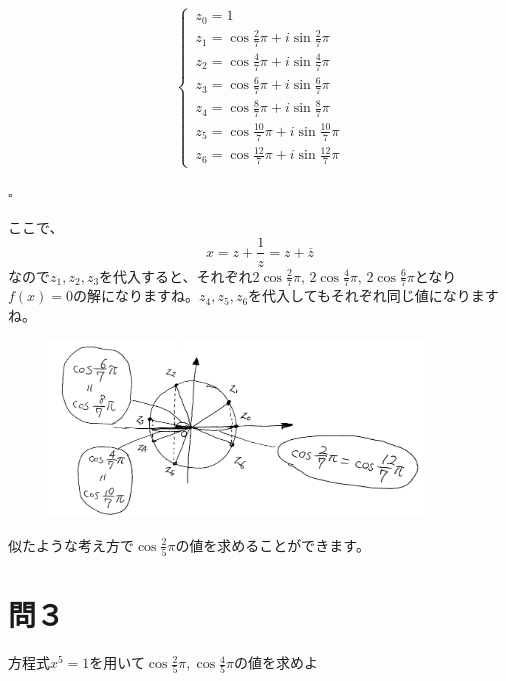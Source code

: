 \begin{align*}
  \begin{cases}
    \, z_0 = 1 \\
    \, z_1 = \cos\frac{2}{7}\pi + i\sin\frac{2}{7}\pi\\
    \, z_2 = \cos\frac{4}{7}\pi + i\sin\frac{4}{7}\pi\\
    \, z_3 = \cos\frac{6}{7}\pi + i\sin\frac{6}{7}\pi\\
    \, z_4 = \cos\frac{8}{7}\pi + i\sin\frac{8}{7}\pi\\
    \, z_5 = \cos\frac{10}{7}\pi + i\sin\frac{10}{7}\pi\\
    \, z_6 = \cos\frac{12}{7}\pi + i\sin\frac{12}{7}\pi
  \end{cases}
\end{align*}
\begin{flushright}
  $\square$
\end{flushright}

\vspace{10mm}
ここで、
$$x = z + \frac{1}{z} = z + \overline{z}$$
なので$z_1,z_2,z_3$を代入すると、それぞれ$2\cos \frac{2}{7}\pi,\, 2\cos\frac{4}{7}\pi,\, 2\cos\frac{6}{7}\pi$となり$f(x) = 0$の解になりますね。$z_4,z_5,z_6$を代入してもそれぞれ同じ値になりますね。
\begin{figure}[H]
  \centering
  \includegraphics[width=10cm]{tuzi/image/1}
\end{figure}\par
似たような考え方で$\cos \frac{2}{5}\pi$の値を求めることができます。

%
\section*{問３}
\begin{screen}
方程式$x^5 = 1$を用いて$\cos\frac{2}{5}\pi,\cos\frac{4}{5}\pi$の値を求めよ
\end{screen}
%

